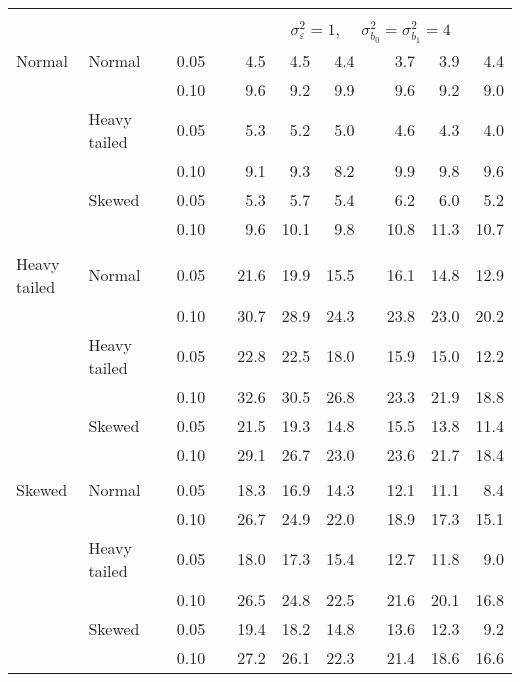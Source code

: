 \begin{table}[ht]
\begin{scriptsize}
\begin{tabular}{ll p{.1cm} c p{.1cm} rrr p{.1cm} rrr}
&&&&&&&&&&&\\
& && && \multicolumn{7}{c}{$\sigma_{\varepsilon}^2 = 1$, \ \ $\sigma_{b_0}^2 = \sigma_{b_1}^2 = 4$} \\ \cline{6-12}
\rowcolor{gray!20} Normal & Normal &  & 0.05 &  & 4.5 & 4.5 & 4.4 &  & 3.7 & 3.9 & 4.4 \\ 
\rowcolor{gray!20}    &  &  & 0.10 &  & 9.6 & 9.2 & 9.9 &  & 9.6 & 9.2 & 9.0 \\ 
\rowcolor{gray!20}    & Heavy tailed &  & 0.05 &  & 5.3 & 5.2 & 5.0 &  & 4.6 & 4.3 & 4.0 \\ 
\rowcolor{gray!20}    &  &  & 0.10 &  & 9.1 & 9.3 & 8.2 &  & 9.9 & 9.8 & 9.6 \\ 
\rowcolor{gray!20}    & Skewed &  & 0.05 &  & 5.3 & 5.7 & 5.4 &  & 6.2 & 6.0 & 5.2 \\ 
\rowcolor{gray!20}    &  &  & 0.10 &  & 9.6 & 10.1 & 9.8 &  & 10.8 & 11.3 & 10.7 \\ 
&&&&&&&&&&&\\
  Heavy tailed & Normal &  & 0.05 &  & 21.6 & 19.9 & 15.5 &  & 16.1 & 14.8 & 12.9 \\ 
   &  &  & 0.10 &  & 30.7 & 28.9 & 24.3 &  & 23.8 & 23.0 & 20.2 \\ 
   & Heavy tailed &  & 0.05 &  & 22.8 & 22.5 & 18.0 &  & 15.9 & 15.0 & 12.2 \\ 
   &  &  & 0.10 &  & 32.6 & 30.5 & 26.8 &  & 23.3 & 21.9 & 18.8 \\ 
   & Skewed &  & 0.05 &  & 21.5 & 19.3 & 14.8 &  & 15.5 & 13.8 & 11.4 \\ 
   &  &  & 0.10 &  & 29.1 & 26.7 & 23.0 &  & 23.6 & 21.7 & 18.4 \\ 
&&&&&&&&&&&\\
  Skewed & Normal &  & 0.05 &  & 18.3 & 16.9 & 14.3 &  & 12.1 & 11.1 & 8.4 \\ 
   &  &  & 0.10 &  & 26.7 & 24.9 & 22.0 &  & 18.9 & 17.3 & 15.1 \\ 
   & Heavy tailed &  & 0.05 &  & 18.0 & 17.3 & 15.4 &  & 12.7 & 11.8 & 9.0 \\ 
   &  &  & 0.10 &  & 26.5 & 24.8 & 22.5 &  & 21.6 & 20.1 & 16.8 \\ 
   & Skewed &  & 0.05 &  & 19.4 & 18.2 & 14.8 &  & 13.6 & 12.3 & 9.2 \\ 
   &  &  & 0.10 &  & 27.2 & 26.1 & 22.3 &  & 21.4 & 18.6 & 16.6 \\ 

\hline
\end{tabular}
\end{scriptsize}
\end{table}



